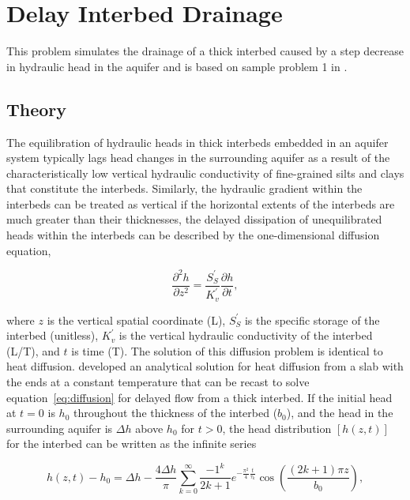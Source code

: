 \section{Delay Interbed Drainage}
This problem simulates the drainage of a thick interbed caused by a step decrease in hydraulic head in the aquifer and is based on sample problem 1 in \cite{hoffmann2003modflow}. 


\subsection{Theory}

The equilibration of hydraulic heads in thick interbeds embedded in an aquifer system typically lags head changes in the surrounding aquifer as a result of the characteristically low vertical hydraulic conductivity of fine-grained silts and clays that constitute the interbeds. Similarly, the hydraulic gradient within the interbeds can be treated as vertical if the horizontal extents of the interbeds are much greater than their thicknesses, the delayed dissipation of unequilibrated heads within the interbeds can be described by the one-dimensional diffusion equation,

\begin{equation}
	\frac{\partial ^2 h}{\partial z^2} = \frac{S^{\prime}_{S}}{K^{\prime}_{v}} \frac{\partial h}{\partial t},
	\label{eq:diffusion}
\end{equation}

\noindent where $z$ is the vertical spatial coordinate (L), $S^{\prime}_{S}$ is the specific storage of the interbed (unitless), $K^{\prime}_{v}$ is the vertical hydraulic conductivity of the interbed (L/T), and $t$ is time (T). The solution of this diffusion problem is identical to heat diffusion. \cite{carslaw1959conduction} developed an analytical solution for heat diffusion from a slab with the ends at a constant temperature that can be recast to solve equation~\ref{eq:diffusion} for delayed flow from a thick interbed. If the initial head at $t = 0$ is $h_0$ throughout the thickness of the interbed ($b_0$), and the head in the surrounding aquifer is $\Delta h$ above $h_0$ for $t > 0$, the head distribution $[h(z, t)]$ for the interbed can be written as the infinite series

\begin{equation}
	h(z, t) - h_0 = \Delta h - \frac{4 \Delta h}{\pi} \sum^{\infty}_{k = 0} \frac{-1^k}{2k + 1} e^{-\frac{\pi^2}{4} \frac{t}{\tau_k}} \cos \left( \frac{(2k + 1) \pi z}{b_0} \right),
	\label{eq:headdist}
\end{equation}

